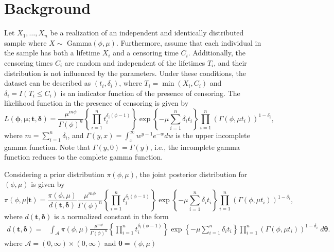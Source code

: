 \section{Background}\label{sec:2}

Let $X_1,\ldots,X_n$ be a realization of an independent and identically distributed sample where $X\sim$ Gamma$(\phi,\mu)$. Furthermore, assume that each individual in the sample has both a lifetime $X_i$ and a censoring time $C_i$. Additionally, the censoring times $C_i$ are random and independent of the lifetimes $T_i$, and their distribution is not influenced by the parameters. Under these conditions, the dataset can be described as $(t_i,\delta_i)$, where $T_i=\min(X_i,C_i)$ and $\delta_i=I(T_i\leq C_i)$ is an indicator function of the presence of censoring. The likelihood function in the presence of censoring is given by
\begin{equation*}L(\boldsymbol{\phi,\mu; t,\delta})
=\frac{\mu^{m\phi}}{\Gamma(\phi)^n}\left\{\prod_{i=1}^n{t_i^{\delta_i(\phi-1)}}\right\}\exp\left\{-\mu\sum_{i=1}^n {\delta_i}t_i\right\}\prod_{i=1}^n\left(\Gamma(\phi,\mu t_i)\right)^{1-\delta_i},
\end{equation*}
where $m=\sum_{i=1}^{n}\delta_i$, and $\Gamma(y,x)  =\int_{x}^{\infty}{w^{y-1}e^{-w}dw}$ is the upper incomplete gamma function. Note that $\Gamma(y,0)=\Gamma(y)$, i.e., the incomplete gamma function reduces to the complete gamma function.

Considering a prior distribution $\pi(\phi,\mu)$, the joint posterior distribution for $(\phi,\mu)$ is given by 
\begin{equation}\label{principal}
\pi(\phi,\mu|\boldsymbol{t})=\frac{\pi(\phi,\mu)}{d(\boldsymbol{t,\delta})} \frac{\mu^{m\phi}}{\Gamma(\phi)^n}\left\{\prod_{i=1}^n{t_i^{\delta_i(\phi-1)}}\right\}\exp\left\{-\mu\sum_{i=1}^n {\delta_i}t_i\right\}\prod_{i=1}^n\left(\Gamma(\phi,\mu t_i)\right)^{1-\delta_i},
\end{equation}
where  $d(\boldsymbol{t,\delta})$ is a normalized constant in the form 
\begin{align*}%
d(\boldsymbol{t,\delta})=&\int_{\mathcal{A}} \pi(\phi,\mu)\frac{\mu^{m\phi}}{\Gamma(\phi)^n}\left\{\prod_{i=1}^n{t_i^{\delta_i(\phi-1)}}\right\}\exp\left\{-\mu\sum_{i=1}^n {\delta_i}t_i\right\}\prod_{i=1}^n\left(\Gamma(\phi,\mu t_i)\right)^{1-\delta_i}\; d\boldsymbol{\theta}.
\end{align*}
where $\mathcal{A}=(0,\infty)\times (0,\infty)$ and $\boldsymbol{\theta}=(\phi,\mu)$

